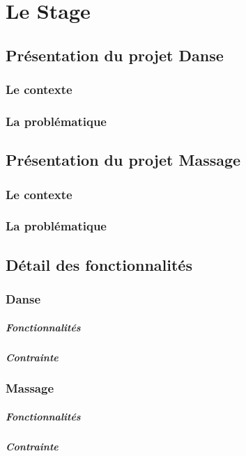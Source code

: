 \documentclass[11pt,a4paper]{report}
\begin{document}
\chapter{Le Stage}
	\section{Présentation du projet Danse}
		\subsection{Le contexte}
		\subsection{La problématique}
	\section{Présentation du projet Massage}
		\subsection{Le contexte}
		\subsection{La problématique}
	\section{Détail des fonctionnalités}
		\subsection{Danse}
			\paragraph{Fonctionnalités}
			\paragraph{Contrainte}
		\subsection{Massage}
			\paragraph{Fonctionnalités}
			\paragraph{Contrainte}
\end{document}
